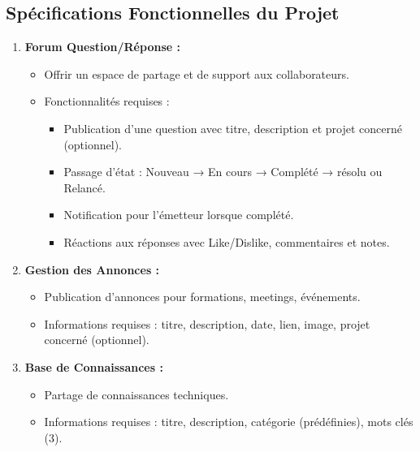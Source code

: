 \documentclass{article}
\begin{document}
        \subsection{Spécifications Fonctionnelles du Projet}
            \begin{enumerate}
                \item \textbf{Forum Question/Réponse :}
                \begin{itemize}
                    \item Offrir un espace de partage et de support aux collaborateurs.
                \item Fonctionnalités requises :
                    \begin{itemize}
                        \item Publication d'une question avec titre, description et projet concerné (optionnel).
                        \item Passage d'état : Nouveau → En cours → Complété → résolu ou Relancé.
                        \item Notification pour l'émetteur lorsque complété.
                        \item Réactions aux réponses avec Like/Dislike, commentaires et notes.
                    \end{itemize}
                \end{itemize}
                
                \item \textbf{Gestion des Annonces :}
                \begin{itemize}
                    \item Publication d'annonces pour formations, meetings, événements.
                    \item Informations requises : titre, description, date, lien, image, projet concerné (optionnel).
                \end{itemize}
                
                \item \textbf{Base de Connaissances :}
                \begin{itemize}
                    \item Partage de connaissances techniques.
                    \item Informations requises : titre, description, catégorie (prédéfinies), mots clés (3).
                \end{itemize}
                

\end{enumerate}
\end{document}
